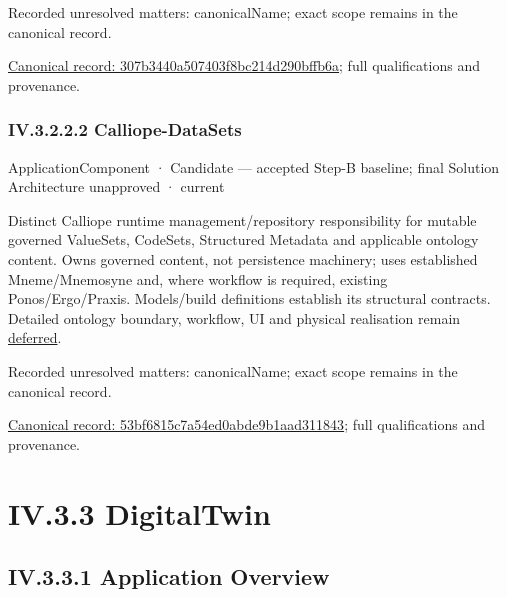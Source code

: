 {\small Recorded unresolved matters: canonicalName; exact scope remains in the canonical record.}\par
{\footnotesize \href{../../../../../../../../continuum/application/application-component/307b3440a507403f8bc214d290bffb6a.md}{Canonical record: 307b3440a507403f8bc214d290bffb6a}; full qualifications and provenance.}\par
\subsubsection*{IV.3.2.2.2 Calliope-DataSets}
\label{navigation:IV.3.2.2.2}

\label{element:53bf6815c7a54ed0abde9b1aad311843}
{\small ApplicationComponent · Candidate — accepted Step-B baseline; final Solution Architecture unapproved · current}\par

Distinct Calliope runtime management/repository responsibility for mutable governed
ValueSets, CodeSets, Structured Metadata and applicable ontology content. Owns
governed content, not persistence machinery; uses established Mneme/Mnemosyne and,
where workflow is required, existing Ponos/Ergo/Praxis. Models/build definitions
establish its structural contracts. Detailed ontology boundary, workflow, UI and
physical realisation remain \hyperref[element:466ad8f75a954c0581b5bba090443849]{deferred}.


{\small Recorded unresolved matters: canonicalName; exact scope remains in the canonical record.}\par
{\footnotesize \href{../../../../../../../../continuum/application/application-component/53bf6815c7a54ed0abde9b1aad311843.md}{Canonical record: 53bf6815c7a54ed0abde9b1aad311843}; full qualifications and provenance.}\par
\section*{IV.3.3 DigitalTwin}
\label{navigation:IV.3.3}

\subsection*{IV.3.3.1 Application Overview}
\label{navigation:IV.3.3.1}

